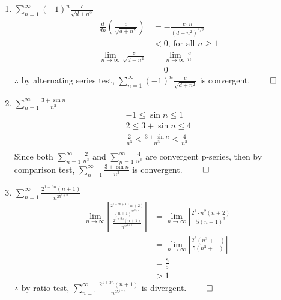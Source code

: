 \documentclass[12pt, a4paper]{article}
\begin{document}
\begin{enumerate}[Q\arabic*.]
\begin{enumerate}[(\alph*)]
    \item $\displaystyle \sum^{\infty}_{n=1}(-1)^n\frac{c}{\sqrt{d+n^2}}$
      \begin{align*}
        \frac{d}{dn}(\frac{c}{\sqrt{d+n^2}}) &= -\frac{c \cdot n}{(d+n^2)^{3/2}}\\
                                             &< 0\text{, for all $n \geq 1$}\\
        \lim_{n\rightarrow\infty}\frac{c}{\sqrt{d+n^2}} &= \lim_{n\rightarrow\infty}\frac{c}{n}\\
                                                        &= 0
      \end{align*}
      $\therefore$ by alternating series test, $\displaystyle \sum^{\infty}_{n=1}(-1)^n\frac{c}{\sqrt{d+n^2}}$ is convergent. $\qed$

    \item $\displaystyle \sum^{\infty}_{n=1} \frac{3+\sin n}{n^3}$
      \begin{align*}
      -1 \leq \sin n \leq 1\\
      2 \leq 3 + \sin n \leq 4\\
      \frac{2}{n^3} \leq \frac{3+\sin n}{n^3} \leq \frac{4}{n^3}\\
      \end{align*}
      Since both $\displaystyle \sum^{\infty}_{n=1} \frac{2}{n^3}$ and $\displaystyle \sum^{\infty}_{n=1} \frac{4}{n^3}$ are convergent p-series, then by comparison test, $\displaystyle \sum^{\infty}_{n=1} \frac{3+\sin n}{n^3}$ is convergent. $\qed$ 
    \item $\displaystyle \sum^{\infty}_{n=1}\frac{2^{1+3n}(n+1)}{n^25^{1+n}}$
      \begin{align*}
        \lim_{n\rightarrow\infty}|\frac{\frac{2^{1+3n+3}(n+2)}{(n+1)^25^{2+n}}}{\frac{2^{1+3n}(n+1)}{n^25^{1+n}}}| &= \lim_{n\rightarrow\infty}|\frac{2^3\cdot n^2(n+2)}{5(n+1)^3}|\\
                                                                                                                   &= \lim_{n\rightarrow\infty}|\frac{2^3(n^3+\ldots)}{5(n^3+\ldots)}|\\
                                                                                                                   &= \frac{8}{5}\\
                                                                                                                   &> 1
      \end{align*}
      $\therefore$ by ratio test, $\displaystyle \sum^{\infty}_{n=1}\frac{2^{1+3n}(n+1)}{n^25^{1+n}}$ is divergent. $\qed$ 
    \end{enumerate}


\end{enumerate}
\end{document}
